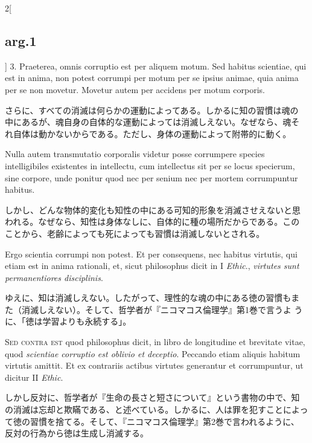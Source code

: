 \documentclass[paper=a4paper,fontsize=10pt,jafontsize=9pt,titlepage]{jlreq}
\begin{document}
\begin{paracol}{2}[\subsection{arg.1}]
3. Praeterea, omnis corruptio est per aliquem motum. Sed habitus
scientiae, qui est in anima, non potest corrumpi per motum per se
ipsius animae, quia anima per se non movetur. Movetur autem per
accidens per motum corporis.

\switchcolumn

さらに、すべての消滅は何らかの運動によってある。しかるに知の習慣は魂の
中にあるが、魂自身の自体的な運動によっては消滅しえない。なぜなら、魂そ
れ自体は動かないからである。ただし、身体の運動によって附帯的に動く。

\switchcolumn*

Nulla autem transmutatio corporalis videtur posse corrumpere species
intelligibiles existentes in intellectu, cum intellectus sit per se
locus specierum, sine corpore, unde ponitur quod nec per senium nec
per mortem corrumpuntur habitus.

\switchcolumn

しかし、どんな物体的変化も知性の中にある可知的形象を消滅させえないと思
われる。なぜなら、知性は身体なしに、自体的に種の場所だからである。この
ことから、老齢によっても死によっても習慣は消滅しないとされる。

\switchcolumn*

Ergo scientia corrumpi non potest. Et per consequens, nec habitus
virtutis, qui etiam est in anima rationali, et, sicut philosophus
dicit in I {\itshape Ethic}., {\itshape virtutes sunt permanentiores
disciplinis}.

\switchcolumn

ゆえに、知は消滅しえない。したがって、理性的な魂の中にある徳の習慣もま
た（消滅しえない）。そして、哲学者が『ニコマコス倫理学』第1巻で言うよ
うに、「徳は学習よりも永続する」。

\switchcolumn*[\subsection{s.c.}]

{\scshape Sed contra est} quod philosophus dicit, in libro de
longitudine et brevitate vitae, quod {\itshape scientiae corruptio est
oblivio et deceptio}. Peccando etiam aliquis habitum virtutis
amittit. Et ex contrariis actibus virtutes generantur et corrumpuntur,
ut dicitur II {\itshape Ethic}.

\switchcolumn

しかし反対に、哲学者が『生命の長さと短さについて』という書物の中で、知
の消滅は忘却と欺瞞である、と述べている。しかるに、人は罪を犯すことによっ
て徳の習慣を捨てる。そして、『ニコマコス倫理学』第2巻で言われるように、
反対の行為から徳は生成し消滅する。


\end{paracol}
\end{document}
